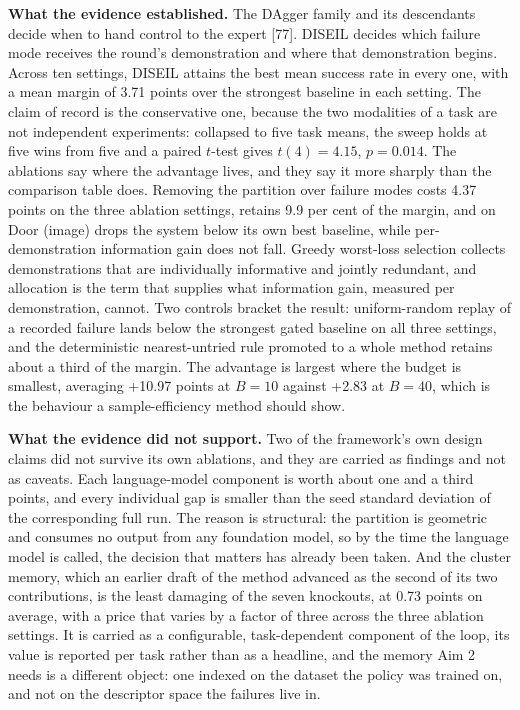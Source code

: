 \documentclass[
  11pt,
]{article}
\begin{document}
\textbf{What the evidence established.} The DAgger family and its
descendants decide when to hand control to the expert {[}77{]}. DISEIL
decides which failure mode receives the round's demonstration and where
that demonstration begins. Across ten settings, DISEIL attains the best
mean success rate in every one, with a mean margin of 3.71 points over
the strongest baseline in each setting. The claim of record is the
conservative one, because the two modalities of a task are not
independent experiments: collapsed to five task means, the sweep holds
at five wins from five and a paired \(t\)-test gives \(t(4) = 4.15\),
\(p = 0.014\). The ablations say where the advantage lives, and they say
it more sharply than the comparison table does. Removing the partition
over failure modes costs 4.37 points on the three ablation settings,
retains 9.9 per cent of the margin, and on Door (image) drops the system
below its own best baseline, while per-demonstration information gain
does not fall. Greedy worst-loss selection collects demonstrations that
are individually informative and jointly redundant, and allocation is
the term that supplies what information gain, measured per
demonstration, cannot. Two controls bracket the result: uniform-random
replay of a recorded failure lands below the strongest gated baseline on
all three settings, and the deterministic nearest-untried rule promoted
to a whole method retains about a third of the margin. The advantage is
largest where the budget is smallest, averaging +10.97 points at
\(B = 10\) against +2.83 at \(B = 40\), which is the behaviour a
sample-efficiency method should show.

\textbf{What the evidence did not support.} Two of the framework's own
design claims did not survive its own ablations, and they are carried as
findings and not as caveats. Each language-model component is worth
about one and a third points, and every individual gap is smaller than
the seed standard deviation of the corresponding full run. The reason is
structural: the partition is geometric and consumes no output from any
foundation model, so by the time the language model is called, the
decision that matters has already been taken. And the cluster memory,
which an earlier draft of the method advanced as the second of its two
contributions, is the least damaging of the seven knockouts, at 0.73
points on average, with a price that varies by a factor of three across
the three ablation settings. It is carried as a configurable,
task-dependent component of the loop, its value is reported per task
rather than as a headline, and the memory Aim 2 needs is a different
object: one indexed on the dataset the policy was trained on, and not on
the descriptor space the failures live in.
\end{document}
